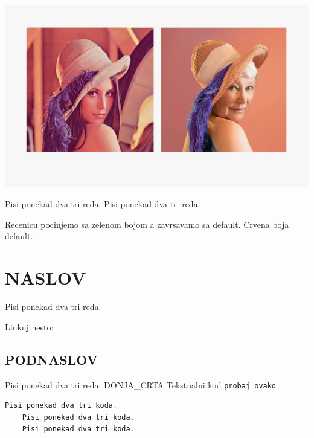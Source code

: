 \documentclass[12pt]{report}
\newcommand{\code}[1]{\texttt{#1}} %
\newcommand{\mygreen}[1]{{\color{my_green}#1}}
\newcommand{\myred}[1]{{\color{my_red}#1}}
\begin{document}
\begin{center}
	\includegraphics[scale=0.25]{introduction1.png}
\end{center}



Pisi ponekad dva tri reda.
\newline
Pisi ponekad dva tri reda.
\newline


\mygreen{Recenicu pocinjemo sa zelenom bojom} a zavrsavamo sa default.
\myred{Crvena boja} default.



\section{NASLOV}
Pisi ponekad dva tri reda.

Linkuj nesto:

\subsection{PODNASLOV}
Pisi ponekad dva tri reda.
\newline
DONJA{\_}CRTA
\newline
Tekstualni kod \code{probaj ovako}
\begin{lstlisting}[language=C, caption= Opis liste.]
	Pisi ponekad dva tri koda.
	Pisi ponekad dva tri koda.
	Pisi ponekad dva tri koda.
\end{lstlisting}
\end{document}
